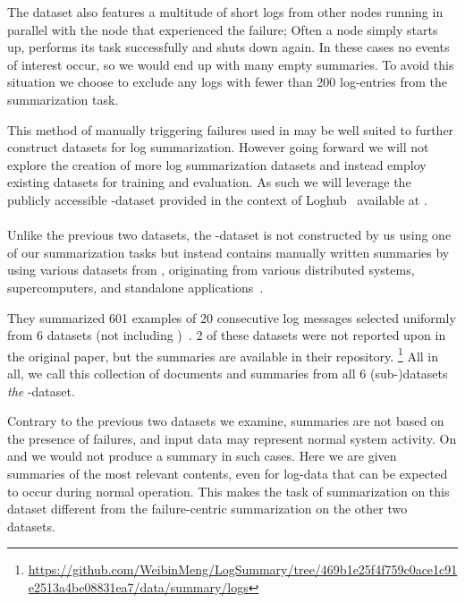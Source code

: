 The dataset also features a multitude of short logs from other nodes running in parallel with the node that experienced the failure;
Often a node simply starts up, performs its task successfully and shuts down again.
In these cases no events of interest occur, so we would end up with many empty summaries.
To avoid this situation we choose to exclude any logs with fewer than 200 log-entries from the summarization task.

This method of manually triggering failures used in \parencite{hadoop_dataset} may be well suited to further construct datasets for log summarization.
However going forward we will not explore the creation of more log summarization datasets and instead employ existing datasets for training and evaluation.
As such we will leverage the publicly accessible \hadoop{}-dataset
provided in the context of Loghub~\parencite{loghub} available at \parencite{loghub_datasets}.

\paragraph{\logsummary{}}

Unlike the previous two datasets, the \logsummary{}-dataset is not constructed by us using one of our summarization tasks
but instead contains manually written summaries by \citeauthor*{log_summary} using various datasets from \parencite{loghub_datasets},
originating from various distributed systems, supercomputers, and standalone applications~\parencite{loghub}.

They summarized 601 examples of 20 consecutive log messages selected uniformly from 6 datasets (not including \hadoop{})~\parencite[6]{log_summary}.
2 of these datasets were not reported upon in the original paper, but the summaries are available in their repository.%
\footnote{\url{https://github.com/WeibinMeng/LogSummary/tree/469b1e25f4f759c0ace1c91e2513a4be08831ea7/data/summary/logs}}
All in all, we call this collection of documents and summaries from all 6 (sub-)datasets \emph{the} \logsummary{}-dataset.

Contrary to the previous two datasets we examine,
summaries are not based on the presence of failures,
and input data may represent normal system activity.
On \telco{} and \hadoop{} we would not produce a summary in such cases.
Here we are given summaries of the most relevant contents, even for log-data that can be expected to occur during normal operation.
This makes the task of summarization on this dataset different from the failure-centric summarization on the other two datasets.

